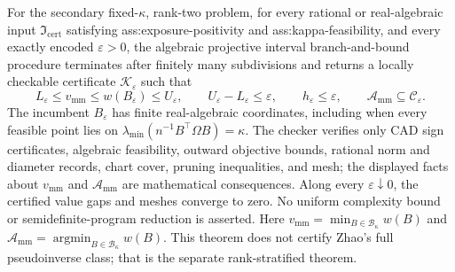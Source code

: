 For the secondary fixed-\(\kappa\), rank-two problem, for every rational or real-algebraic input \(\mathfrak I_{\mathrm{cert}}\) satisfying ass:exposure-positivity and ass:kappa-feasibility, and every exactly encoded \(\varepsilon>0\), the algebraic projective interval branch-and-bound procedure terminates after finitely many subdivisions and returns a locally checkable certificate \(\mathscr K_{\varepsilon}\) such that
\[
 L_{\varepsilon}\le v_{\mathrm{mm}}\le w(B_{\varepsilon})\le U_{\varepsilon},
 \qquad U_{\varepsilon}-L_{\varepsilon}\le\varepsilon,
 \qquad h_{\varepsilon}\le\varepsilon,
 \qquad \mathcal A_{\mathrm{mm}}\subseteq\mathcal C_{\varepsilon}.
\]
The incumbent \(B_{\varepsilon}\) has finite real-algebraic coordinates, including when every feasible point lies on \(\lambda_{\min}(n^{-1}B^{\top}\Omega B)=\kappa\).  The checker verifies only CAD sign certificates, algebraic feasibility, outward objective bounds, rational norm and diameter records, chart cover, pruning inequalities, and mesh; the displayed facts about \(v_{\mathrm{mm}}\) and \(\mathcal A_{\mathrm{mm}}\) are mathematical consequences.  Along every \(\varepsilon\downarrow0\), the certified value gaps and meshes converge to zero.  No uniform complexity bound or semidefinite-program reduction is asserted.  Here \(v_{\mathrm{mm}}=\min_{B\in\mathcal B_\kappa}w(B)\) and \(\mathcal A_{\mathrm{mm}}=\operatorname*{argmin}_{B\in\mathcal B_\kappa}w(B)\).  This theorem does not certify Zhao's full pseudoinverse class; that is the separate rank-stratified theorem.